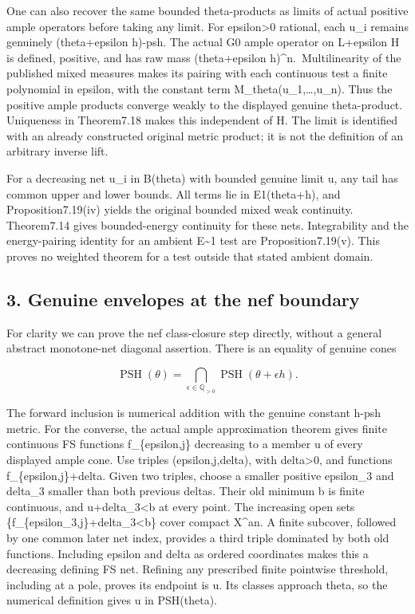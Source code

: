 \documentclass[
]{article}
\begin{document}
One can also recover the same bounded theta-products as limits of actual
positive ample operators before taking any limit. For
epsilon\textgreater0 rational, each u\_i remains genuinely
(theta+epsilon h)-psh. The actual G0 ample operator on L+epsilon H is
defined, positive, and has raw mass (theta+epsilon
h)\^{}n.~Multilinearity of the published mixed measures makes its
pairing with each continuous test a finite polynomial in epsilon, with
the constant term M\_theta(u\_1,\ldots,u\_n). Thus the positive ample
products converge weakly to the displayed genuine theta-product.
Uniqueness in Theorem7.18 makes this independent of H. The limit is
identified with an already constructed original metric product; it is
not the definition of an arbitrary inverse lift.

For a decreasing net u\_i in B(theta) with bounded genuine limit u, any
tail has common upper and lower bounds. All terms lie in E1(theta+h),
and Proposition7.19(iv) yields the original bounded mixed weak
continuity. Theorem7.14 gives bounded-energy continuity for these nets.
Integrability and the energy-pairing identity for an ambient
E\textasciitilde1 test are Proposition7.19(v). This proves no weighted
theorem for a test outside that stated ambient domain.

\subsection{3. Genuine envelopes at the nef
boundary}\label{genuine-envelopes-at-the-nef-boundary}

For clarity we can prove the nef class-closure step directly, without a
general abstract monotone-net diagonal assertion. There is an equality
of genuine cones

\[\operatorname{PSH}(\theta)=\bigcap_{\epsilon\in\mathbb Q_{>0}}\operatorname{PSH}(\theta+\epsilon h).\]

The forward inclusion is numerical addition with the genuine constant
h-psh metric. For the converse, the actual ample approximation theorem
gives finite continuous FS functions f\_\{epsilon,j\} decreasing to a
member u of every displayed ample cone. Use triples (epsilon,j,delta),
with delta\textgreater0, and functions f\_\{epsilon,j\}+delta. Given two
triples, choose a smaller positive epsilon\_3 and delta\_3 smaller than
both previous deltas. Their old minimum b is finite continuous, and
u+delta\_3\textless b at every point. The increasing open sets
\{f\_\{epsilon\_3,j\}+delta\_3\textless b\} cover compact X\^{}an. A
finite subcover, followed by one common later net index, provides a
third triple dominated by both old functions. Including epsilon and
delta as ordered coordinates makes this a decreasing defining FS net.
Refining any prescribed finite pointwise threshold, including at a pole,
proves its endpoint is u. Its classes approach theta, so the numerical
definition gives u in PSH(theta).
\end{document}
